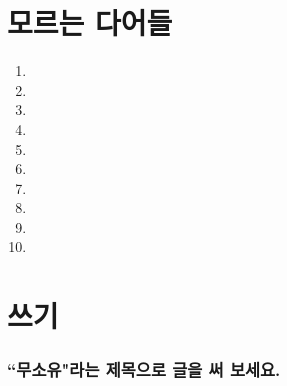 \documentclass[11pt]{article}
\begin{document}
\section{모르는 다어들}
\begin{enumerate}
  \item 
  \item 
  \item 
  \item 
  \item 
  \item 
  \item 
  \item 
  \item 
  \item 
\end{enumerate}
\section{쓰기}
\doublespacing
\subsubsection*{``무소유"라는 제목으로 글을 써 보세요.}
\end{document}
